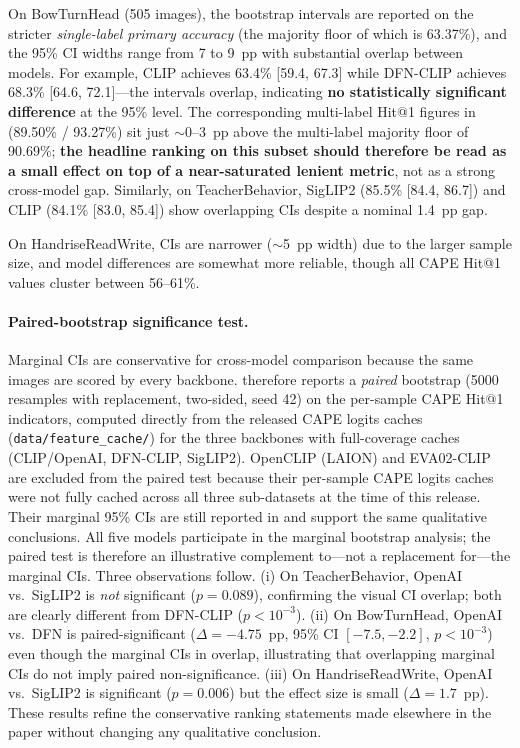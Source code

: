 \documentclass[symmetry,article,submit,pdftex,moreauthors]{Definitions/mdpi}
\begin{document}
On BowTurnHead (505 images), the bootstrap intervals are reported on the stricter \emph{single-label primary accuracy} (the majority floor of which is 63.37\%), and the 95\% CI widths range from 7 to 9~pp with substantial overlap between models. For example, CLIP achieves 63.4\% [59.4, 67.3] while DFN-CLIP achieves 68.3\% [64.6, 72.1]---the intervals overlap, indicating \textbf{no statistically significant difference} at the 95\% level. The corresponding multi-label Hit@1 figures in  (89.50\% / 93.27\%) sit just $\sim$0--3~pp above the multi-label majority floor of 90.69\%; \textbf{the headline ranking on this subset should therefore be read as a small effect on top of a near-saturated lenient metric}, not as a strong cross-model gap. Similarly, on TeacherBehavior, SigLIP2 (85.5\% [84.4, 86.7]) and CLIP (84.1\% [83.0, 85.4]) show overlapping CIs despite a nominal 1.4~pp gap.

On HandriseReadWrite, CIs are narrower ($\sim$5~pp width) due to the larger sample size, and model differences are somewhat more reliable, though all CAPE Hit@1 values cluster between 56--61\%.

\paragraph{Paired-bootstrap significance test.} Marginal CIs are conservative for cross-model comparison because the same images are scored by every backbone.  therefore reports a \emph{paired} bootstrap (5000 resamples with replacement, two-sided, seed 42) on the per-sample CAPE Hit@1 indicators, computed directly from the released CAPE logits caches (\texttt{data/feature\_cache/}) for the three backbones with full-coverage caches (CLIP/OpenAI, DFN-CLIP, SigLIP2). OpenCLIP (LAION) and EVA02-CLIP are excluded from the paired test because their per-sample CAPE logits caches were not fully cached across all three sub-datasets at the time of this release. Their marginal 95\% CIs are still reported in  and support the same qualitative conclusions. All five models participate in the marginal bootstrap analysis; the paired test is therefore an illustrative complement to---not a replacement for---the marginal CIs. Three observations follow. (i) On TeacherBehavior, OpenAI vs.\ SigLIP2 is \emph{not} significant ($p=0.089$), confirming the visual CI overlap; both are clearly different from DFN-CLIP ($p<10^{-3}$). (ii) On BowTurnHead, OpenAI vs.\ DFN is paired-significant ($\Delta=-4.75$~pp, 95\% CI $[-7.5,-2.2]$, $p<10^{-3}$) even though the marginal CIs in  overlap, illustrating that overlapping marginal CIs do not imply paired non-significance. (iii) On HandriseReadWrite, OpenAI vs.\ SigLIP2 is significant ($p=0.006$) but the effect size is small ($\Delta=1.7$~pp). These results refine the conservative ranking statements made elsewhere in the paper without changing any qualitative conclusion.
\end{document}
